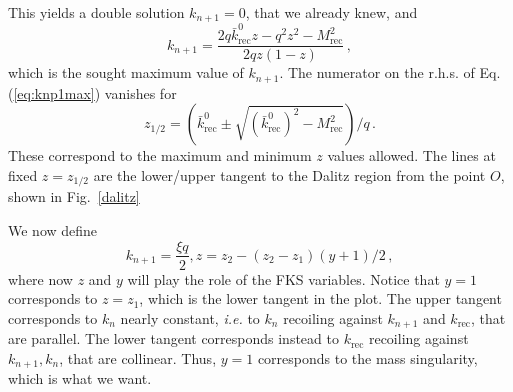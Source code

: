 \documentclass[11pt,a4paper]{article}
\newcommand{\tmop}[1]{\ensuremath{\operatorname{#1}}}
\begin{document}
This yields a double solution $k_{n + 1} = 0$, that we already knew, and
\begin{equation}
  k_{n + 1} = \frac{2 q \bar{k}^0_{\tmop{rec}} z - q^2 z^2 -
  M_{\tmop{rec}}^2}{2 qz (1 - z)} \, , \label{eq:knp1max}
\end{equation}
which is the sought maximum value of $k_{n + 1}$. The numerator on the r.h.s. 
of Eq. (\ref{eq:knp1max}) vanishes for
\begin{equation}
  z_{1 / 2} = \left( \bar{k}^0_{\tmop{rec}} \pm \sqrt{(
  \bar{k}^0_{\tmop{rec}})^2 - M_{\tmop{rec}}^2} \right) / q \, .
\end{equation}
These correspond to the maximum and minimum $z$ values allowed. The lines at
fixed $z = z_{1 / 2}$ are the lower/upper tangent to the Dalitz region from
the point $O$, shown in Fig.~\ref{dalitz}

We now define
\begin{equation}
  k_{n + 1} = \frac{\xi q}{2}, z = z_2 - (z_2 - z_1) (y + 1) / 2 \, ,
\end{equation}
where now $z$ and $y$ will play the role of the FKS variables. Notice that $y
= 1$ corresponds to $z = z_1$, which is the lower tangent in the plot. The
upper tangent corresponds to $k_n$ nearly constant, {\it i.e.} to $k_n$ recoiling
against $k_{n + 1}$ and $k_{\tmop{rec}}$, that are parallel. The lower tangent
corresponds instead to $k_{\tmop{rec}}$ recoiling against $k_{n + 1}, k_n$,
that are collinear. Thus, $y = 1$ corresponds to the mass singularity, which
is what we want.
\end{document}
